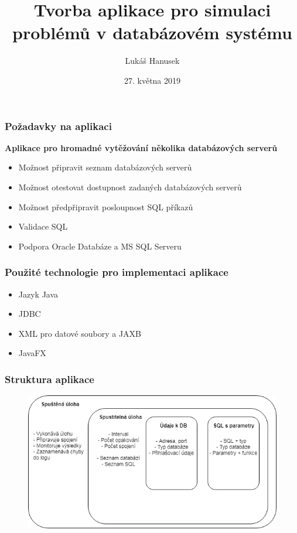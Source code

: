 \documentclass{beamer}
\title[]{Tvorba aplikace pro simulaci problémů v databázovém systému}
\author[] {Lukáš Hanusek}
\date{27. května 2019}
\begin{document}
\begin{frame}
  \titlepage
\end{frame}



\begin{frame}
\frametitle{Požadavky na aplikaci}
\textbf{Aplikace pro hromadné vytěžování několika databázových serverů}

\begin{itemize}
\item Možnost připravit seznam databázových serverů
\item Možnost otestovat dostupnost zadaných databázových serverů
\item Možnost předpřipravit posloupnost SQL příkazů
\item Validace SQL
\item Podpora Oracle Databáze a MS SQL Serveru
\end{itemize}

\end{frame}





\begin{frame}
  \frametitle{Použité technologie pro implementaci aplikace}
  
  \begin{itemize}
      \item Jazyk Java
      \item JDBC
      \item XML pro datové soubory a JAXB
      \item JavaFX
   \end{itemize}
\end{frame}

\begin{frame}
  \frametitle{Struktura aplikace}
      \begin{figure}[h]
  \centering
\includegraphics[width=1.0\textwidth]{img/struct.png}
\end{figure}

\end{frame}
\end{document}
